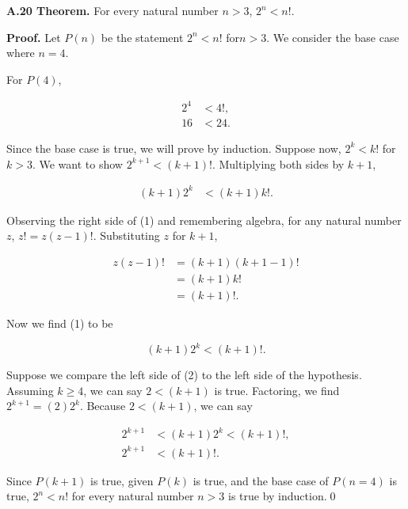 \documentclass[12pt]{article}
\begin{document}
\noindent\textbf{A.20 Theorem.} For every natural number $n>3$, $2^n < n!$.

\bigskip

\noindent\textbf{Proof.} Let $P(n)$ be the statement $2^n < n!$ for$n>3$. We consider the base case where $n=4$. 

\bigskip

\noindent For $P(4)$,


\begin{align*}
2^4 &< 4!, \\
16 &< 24.
\end{align*}


\noindent Since the base case is true, we will prove by induction. Suppose now, $2^k < k!$ for $k>3$. We want to show $2^{k+1} < (k+1)!$. Multiplying both sides by $k+1$,


\begin{align*}
(k+1)2^k &< (k+1)k!.
\end{align*}


\noindent Observing the right side of (1) and remembering algebra, for any natural number $z$, $z!=z(z-1)!$. Substituting $z$ for $k+1$,

 
\begin{align*}
z(z-1)! &= (k+1)(k+1-1)! \\
&= (k+1)k! \\
&= (k+1)!.
\end{align*}


\noindent Now we find (1) to be 

\begin{equation} 
(k+1)2^k < (k+1)!. 
\end{equation}

\noindent Suppose we compare the left side of (2) to the left side of the hypothesis. Assuming $k\geq 4$, we can say $2<(k+1)$ is true. Factoring, we find $2^{k+1}=(2)2^k$. Because $2<(k+1)$, we can say


\begin{align*}
2^{k+1} &< (k+1)2^k < (k+1)!, \\
2^{k+1} &< (k+1)!.
\end{align*}


\noindent Since $P(k+1)$ is true, given $P(k)$ is true, and the base case of $P(n=4)$ is true, $2^n < n!$ for every natural number $n>3$ is true by induction.\qed
\end{document}
